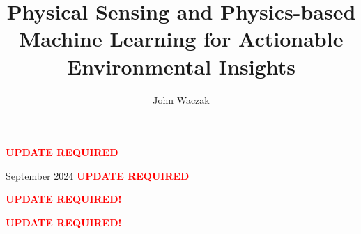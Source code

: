 \documentclass[doublespacing]{utdthesis}
\author{John Waczak}
\title{Physical Sensing and Physics-based Machine Learning for Actionable Environmental Insights}
\begin{document}
\frontmatter

\signaturepage


\begin{dedication} %
  \textbf{\textcolor{red}{UPDATE REQUIRED}}
\end{dedication}

\maketitle

\begin{acks}{September 2024}
  \textbf{\textcolor{red}{UPDATE REQUIRED}}
\end{acks}



\tableofcontents
\listoffigures %
\listoftables %

\mainmatter




%













% 






\appendix %




\begin{thesisbib}  %
  
\end{thesisbib}  %



\begin{biosketch}
  \textbf{\textcolor{red}{UPDATE REQUIRED!}}
\end{biosketch}


\begin{vita}  %
  \textbf{\textcolor{red}{UPDATE REQUIRED!}}
\end{vita}  %
\end{document}

